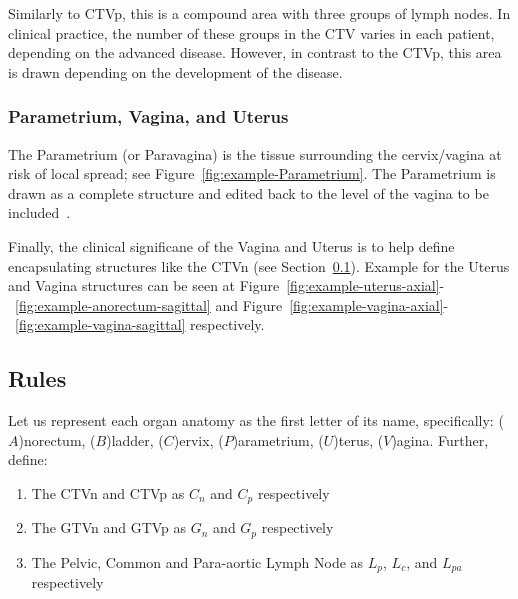\documentclass[12pt,twoside]{report}
\begin{document}
Similarly to CTVp, this is a compound area with three groups of lymph nodes. In clinical practice, the number of these groups in the CTV varies in each patient, depending on the advanced disease. %
However, in contrast to the CTVp, this area is drawn depending on the development of the disease.

\subsubsection{Parametrium, Vagina, and Uterus}\label{sec:data-Parametrium}

The Parametrium (or Paravagina) is the tissue surrounding the cervix/vagina at risk of local spread; see Figure~\ref{fig:example-Parametrium}. The Parametrium is drawn as a complete structure and edited back to the level of the vagina to be included~\cite{AMLART-data}.

Finally, the clinical significane of the Vagina and Uterus is to help define encapsulating structures like the CTVn (see Section~\ref{sec:rules}). Example for the Uterus and Vagina structures can be seen at Figure~\ref{fig:example-uterus-axial}-~\ref{fig:example-anorectum-sagittal} and Figure~\ref{fig:example-vagina-axial}-~\ref{fig:example-vagina-sagittal} respectively.

\subsection{Rules}\label{sec:rules}

Let us represent each organ anatomy as the first letter of its name, specifically: ($A$)norectum, ($B$)ladder, ($C$)ervix, ($P$)arametrium, ($U$)terus, ($V$)agina. Further, define:

\begin{enumerate}
  \item The CTVn and CTVp as $C_n$ and $C_p$ respectively
  \item The GTVn and GTVp as $G_n$ and $G_p$ respectively
  \item The Pelvic, Common and Para-aortic Lymph Node as $L_p$, $L_c$, and $L_{pa}$ respectively
\end{enumerate}
\end{document}
